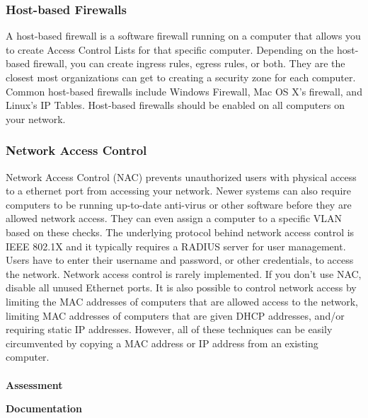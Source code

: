 \subsubsection{Host-based Firewalls}
A host-based firewall is a software firewall running on a computer that allows you to create Access Control Lists for that specific computer. Depending on the host-based firewall, you can create ingress rules, egress rules, or both. They are the closest most organizations can get to creating a security zone for each computer. Common host-based firewalls include Windows Firewall, Mac OS X's firewall, and Linux's IP Tables. Host-based firewalls should be enabled on all computers on your network.
\subsubsection{Network Access Control}\label{subsubsec:"Network Access Control"}
Network Access Control (NAC) prevents unauthorized users with physical access to a ethernet port from accessing your network. Newer systems can also require computers to be running up-to-date anti-virus or other software before they are allowed network access. They can even assign a computer to a specific VLAN based on these checks. The underlying protocol behind network access control is IEEE 802.1X and it typically requires a RADIUS server for user management. Users have to enter their username and password, or other credentials, to access the network. Network access control is rarely implemented. If you don't use NAC, disable all unused Ethernet ports. It is also possible to control network access by limiting the MAC addresses of computers that are allowed access to the network, limiting MAC addresses of computers that are given DHCP addresses, and/or requiring static IP addresses. However, all of these techniques can be easily circumvented by copying a MAC address or IP address from an existing computer.\\\\
\textbf{Assessment}
\begin{description}
\end{description}
\textbf{Documentation}
\begin{description}
\end{description}
